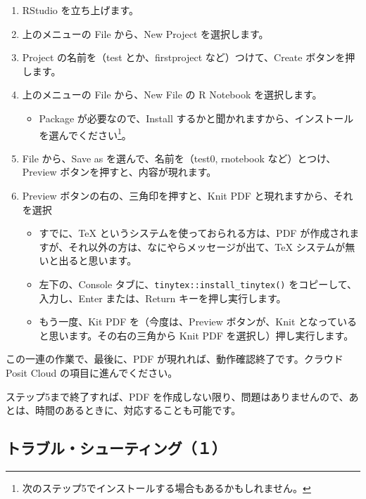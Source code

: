 \documentclass[
  xelatex, ja=standard]{bxjsbook}
\providecommand{\tightlist}{%
  \setlength{\itemsep}{0pt}\setlength{\parskip}{0pt}}
\theoremstyle{definition}
\theoremstyle{definition}
\theoremstyle{definition}
\theoremstyle{definition}
\theoremstyle{remark}
\begin{document}
\begin{enumerate}
\def\labelenumi{\arabic{enumi}.}
\tightlist
\item
  RStudio を立ち上げます。
\item
  上のメニューの File から、New Project を選択します。
\item
  Project の名前を（test とか、firstproject など）つけて、Create ボタンを押します。
\item
  上のメニューの File から、New File の R Notebook を選択します。

  \begin{itemize}
  \tightlist
  \item
    Package が必要なので、Install するかと聞かれますから、インストールを選んでください\footnote{次のステップ5でインストールする場合もあるかもしれません。}。
  \end{itemize}
\item
  File から、Save as を選んで、名前を（test0, rnotebook など）とつけ、Preview ボタンを押すと、内容が現れます。
\item
  Preview ボタンの右の、三角印を押すと、Knit PDF と現れますから、それを選択

  \begin{itemize}
  \tightlist
  \item
    すでに、TeX というシステムを使っておられる方は、PDF が作成されますが、それ以外の方は、なにやらメッセージが出て、TeX システムが無いと出ると思います。
  \item
    左下の、Console タブに、\texttt{tinytex::install\_tinytex()} をコピーして、入力し、Enter または、Return キーを押し実行します。
  \item
    もう一度、Kit PDF を（今度は、Preview ボタンが、Knit となっていると思います。その右の三角から Knit PDF を選択し）押し実行します。
  \end{itemize}
\end{enumerate}

この一連の作業で、最後に、PDF が現れれば、動作確認終了です。クラウド Posit Cloud の項目に進んでください。

ステップ5まで終了すれば、PDF を作成しない限り、問題はありませんので、あとは、時間のあるときに、対応することも可能です。

\hypertarget{ux30c8ux30e9ux30d6ux30ebux30b7ux30e5ux30fcux30c6ux30a3ux30f3ux30b0uxff11}{%
\subsection{トラブル・シューティング（１）}\label{ux30c8ux30e9ux30d6ux30ebux30b7ux30e5ux30fcux30c6ux30a3ux30f3ux30b0uxff11}}
\end{document}
